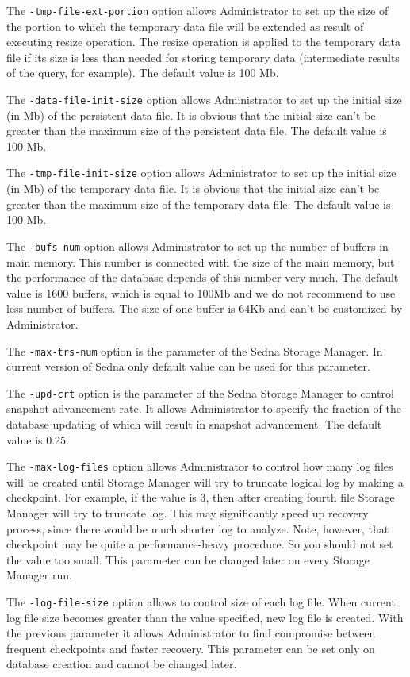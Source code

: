 \documentclass[a4paper,12pt]{article}
\begin{document}
The \verb!-tmp-file-ext-portion! option allows Administrator to set up the size of the portion to which the temporary data file will be extended as result of executing resize operation. The resize operation is applied to the temporary data file if its size is less than needed for storing temporary data (intermediate results of the query, for example). The default value is 100 Mb.

The \verb!-data-file-init-size! option allows Administrator to set up the initial size (in Mb) of the persistent data file. It is obvious that the initial size can't be greater than the maximum size of the persistent data file. The default value is 100 Mb.

The \verb!-tmp-file-init-size! option allows Administrator to set up the initial size (in Mb) of the temporary data file. It is obvious that the initial size can't be greater than the maximum size of the temporary data file. The default value is 100 Mb.

The \verb!-bufs-num! option allows Administrator to set up the number of buffers in main memory. This number is connected with the size of the main memory, but the performance of the database depends of this number very much. The default value is 1600 buffers, which is equal to 100Mb and we do not recommend to use less number of buffers. The size of one buffer is 64Kb and can't be customized by Administrator.

The \verb!-max-trs-num! option is the parameter of the Sedna Storage Manager. In current version of Sedna only default value can be used for this parameter.

The \verb!-upd-crt! option is the parameter of the Sedna Storage Manager to control snapshot advancement rate. It allows Administrator to specify the fraction of the database updating of which will result in snapshot advancement. The default value is 0.25.

The \verb!-max-log-files! option allows Administrator to control how many log files will be created until Storage Manager will try
to truncate logical log by making a checkpoint. For example, if the value is $3$, then after creating fourth file Storage Manager will try to truncate log. This may significantly speed up recovery process, since there would be much shorter log to analyze. Note, however, that checkpoint may be quite a performance-heavy procedure. So you should not set the value too small. This parameter can be changed later on every Storage Manager run.

The \verb!-log-file-size! option allows to control size of each log file. When current log file size becomes greater than the value specified, new log file is created. With the previous parameter it allows Administrator to find compromise between frequent checkpoints and faster recovery. This parameter can be set only on database creation and cannot be changed later.
\end{document}

